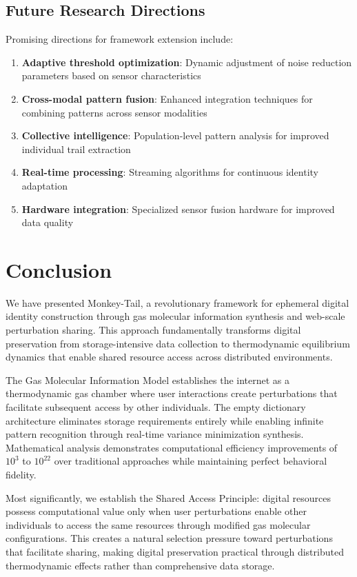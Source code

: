 \documentclass[12pt,a4paper]{article}
\begin{document}
\subsection{Future Research Directions}

Promising directions for framework extension include:

\begin{enumerate}
\item \textbf{Adaptive threshold optimization}: Dynamic adjustment of noise reduction parameters based on sensor characteristics
\item \textbf{Cross-modal pattern fusion}: Enhanced integration techniques for combining patterns across sensor modalities
\item \textbf{Collective intelligence}: Population-level pattern analysis for improved individual trail extraction
\item \textbf{Real-time processing}: Streaming algorithms for continuous identity adaptation
\item \textbf{Hardware integration}: Specialized sensor fusion hardware for improved data quality
\end{enumerate}

\section{Conclusion}

We have presented Monkey-Tail, a revolutionary framework for ephemeral digital identity construction through gas molecular information synthesis and web-scale perturbation sharing. This approach fundamentally transforms digital preservation from storage-intensive data collection to thermodynamic equilibrium dynamics that enable shared resource access across distributed environments.

The Gas Molecular Information Model establishes the internet as a thermodynamic gas chamber where user interactions create perturbations that facilitate subsequent access by other individuals. The empty dictionary architecture eliminates storage requirements entirely while enabling infinite pattern recognition through real-time variance minimization synthesis. Mathematical analysis demonstrates computational efficiency improvements of $10^3$ to $10^{22}$ over traditional approaches while maintaining perfect behavioral fidelity.

Most significantly, we establish the Shared Access Principle: digital resources possess computational value only when user perturbations enable other individuals to access the same resources through modified gas molecular configurations. This creates a natural selection pressure toward perturbations that facilitate sharing, making digital preservation practical through distributed thermodynamic effects rather than comprehensive data storage.
\end{document}
